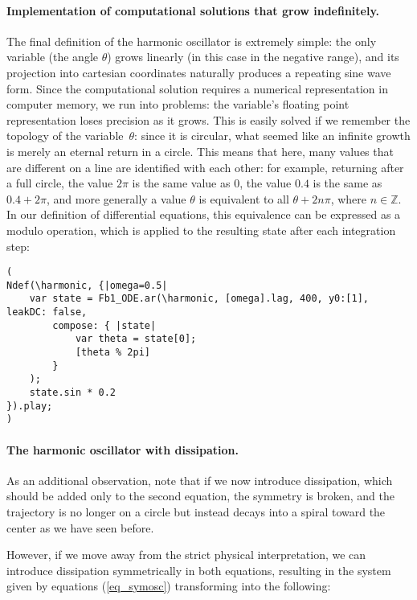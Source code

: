 \documentclass{article}
\begin{document}
\paragraph{Implementation of computational solutions that grow indefinitely.}
The final definition of the harmonic oscillator is extremely simple: the only variable (the angle $\theta$) grows linearly (in this case in the negative range), and its projection into cartesian coordinates naturally produces a repeating sine wave form. Since the computational solution requires a numerical representation in computer memory, we run into problems: the variable's floating point representation loses precision as it grows. This is easily solved if we remember the topology of the variable~$\theta$: since it is circular, what seemed like an infinite growth is merely an eternal return in a circle. This means that here, many values that are different on a line are identified with each other: for example, returning after a full circle, the value $2\pi$ is the same value as $0$, the value $0.4$ is the same as $0.4 + 2\pi$, and more generally a value $\theta$ is equivalent to all $\theta + 2n\pi$, where $n \in \mathbb{Z}$. In our definition of differential equations, this equivalence can be expressed as a modulo operation, which is applied to the resulting state after each integration step:

\begin{lstlisting}[caption=Projecting $\theta$ into a cyclic domain by a modulo operation.]
(
Ndef(\harmonic, {|omega=0.5|
	var state = Fb1_ODE.ar(\harmonic, [omega].lag, 400, y0:[1], leakDC: false,
		compose: { |state|
			var theta = state[0];
			[theta % 2pi]
		}
	);
	state.sin * 0.2
}).play;
)
\end{lstlisting}


\paragraph{The harmonic oscillator with dissipation.}
As an additional observation, note that if we now introduce dissipation, which should be added only to the second equation, the symmetry is broken, and the trajectory is no longer on a circle but instead decays into a spiral toward the center as we have seen before.

However, if we move away from the strict physical interpretation, we can introduce dissipation symmetrically in both equations, resulting in the system given by equations (\ref{eq_symosc}) transforming into the following:
\end{document}
